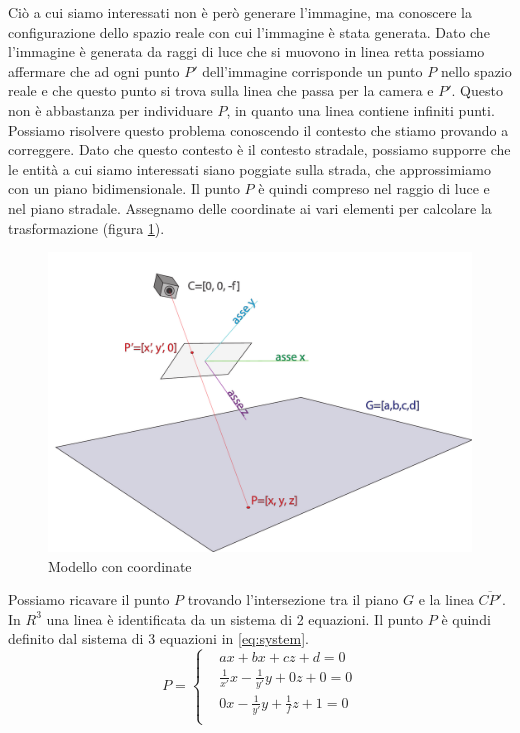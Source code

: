 Ciò a cui siamo interessati non è però generare l'immagine, ma conoscere la configurazione dello spazio reale con cui l'immagine è stata generata.
Dato che l'immagine è generata da raggi di luce che si muovono in linea retta possiamo affermare che ad ogni punto $P'$ dell'immagine corrisponde un punto $P$ nello spazio reale e che questo punto si trova sulla linea che passa per la camera e $P'$.
Questo non è abbastanza per individuare $P$, in quanto una linea contiene infiniti punti.
Possiamo risolvere questo problema conoscendo il contesto che stiamo provando a correggere.
Dato che questo contesto è il contesto stradale, possiamo supporre che le entità a cui siamo interessati siano poggiate sulla strada, che approssimiamo con un piano bidimensionale.
Il punto $P$ è quindi compreso nel raggio di luce e nel piano stradale.
Assegnamo delle coordinate ai vari elementi per calcolare la trasformazione (figura \ref{fig:camera coords}).
\begin{figure}
    \caption{Modello con coordinate}
    \label{fig:camera coords}
    \centering
    \includegraphics[width=\textwidth]{images/camera coords.pdf}
\end{figure}

Possiamo ricavare il punto $P$ trovando l'intersezione tra il piano $G$ e la linea $\overline{CP'}$.
In $R^3$ una linea è identificata da un sistema di 2 equazioni.
Il punto $P$ è quindi definito dal sistema di 3 equazioni in \ref{eq:system}.
\begin{equation}
    \label{eq:system}
    P = 
    \left\{
    \begin{aligned}
         & ax + bx + cz + d = 0                       \\
         & \frac{1}{x'}x - \frac{1}{y'}y + 0z + 0 = 0 \\
         & 0x -  \frac{1}{y'}y + \frac{1}{f}z + 1 = 0 \\
    \end{aligned}
    \right.
\end{equation}


